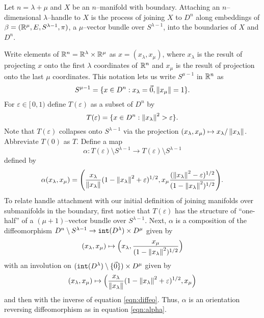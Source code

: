 Let $n=\lambda+\mu$ and $X$ be an $n$--manifold with boundary.
Attaching an $n$--dimensional $\lambda$--handle to $X$ is the process of joining $X$ to $D^n$ along embeddings of $\beta=(\mathbb{R}^\mu,E,S^{\lambda-1},\pi)$, a $\mu$--vector bundle over $S^{\lambda-1}$, into the boundaries of $X$ and $D^n$.

Write elements of $\mathbb{R}^n=\mathbb{R}^\lambda\times\mathbb{R}^\mu$ as $x=(x_\lambda,x_\mu)$, where $x_\lambda$ is the result of projecting $x$ onto the first $\lambda$ coordinates of $\mathbb{R}^n$ and $x_\mu$ is the result of projection onto the last $\mu$ coordinates.
This notation lets us write $S^{\mu-1}$ in $\mathbb{R}^n$ as
\[
	S^{\mu-1} = \{x\in D^n: x_\lambda=\vec{0},\left\lVert x_\mu \right\rVert=1\}.
\]
For $\varepsilon\in [\,0,1)$ define $T(\varepsilon)$ as a subset of $D^n$ by
\[
	T(\varepsilon) = \{x\in D^n: \left\lVert x_\lambda \right\rVert^2>\varepsilon\}.
\]
Note that $T(\varepsilon)$ collapses onto $S^{\lambda-1}$ via the projection $(x_\lambda,x_\mu)\mapsto x_\lambda/\left\lVert x_\lambda \right\rVert$.
Abbreviate $T(0)$ as $T$.
Define a map
\[
	\alpha:T(\varepsilon)\setminus S^{\lambda-1} \to T(\varepsilon)\setminus S^{\lambda-1}
\]
defined by
\begin{equation}
	\alpha(x_\lambda, x_\mu) =
	\Bigg( 
		\frac{x_\lambda}{\left\lVert x_\lambda \right\rVert}
		(1-\left\lVert x_\lambda \right\rVert^2+\varepsilon)^{1/2},
		x_\mu
		\frac{
			(\left\lVert x_\lambda \right\rVert^2-\varepsilon)^{1/2}
		}{
			(1-\left\lVert x_\lambda \right\rVert^2)^{1/2}
		}
	\Bigg).
\end{equation}
To relate handle attachment with our initial definition of joining manifolds over submanifolds in the boundary, first notice that $T(\varepsilon)$ has the structure of ``one-half'' of a $(\mu+1)$--vector bundle over $S^{\lambda-1}$.
Next, $\alpha$ is a composition of the diffeomorphism $D^n\setminus S^{\lambda-1}\to\mathtt{int}(D^\lambda)\times D^\mu$ given by
\begin{equation}
	\label{eqn:diffeo}
	(x_\lambda,x_\mu)\mapsto \Big(x_\lambda,\frac{x_\mu}{(1-\left\lVert x_\lambda \right\rVert^2)^{1/2}}\Big)
\end{equation}
with an involution on $(\mathtt{int}(D^\lambda)\setminus\{\vec{0}\})\times D^\mu$ given by
\begin{equation}
	(x_\lambda,x_\mu)\mapsto \Big(\frac{x_\lambda}{\left\lVert x_\lambda \right\rVert}(1-\left\lVert x_\lambda \right\rVert^2+\varepsilon)^{1/2},x_\mu \Big)
\end{equation}
and then with the inverse of equation \ref{eqn:diffeo}.
Thus, $\alpha$ is an orientation reversing diffeomorphism as in equation \ref{eqn:alpha}.

